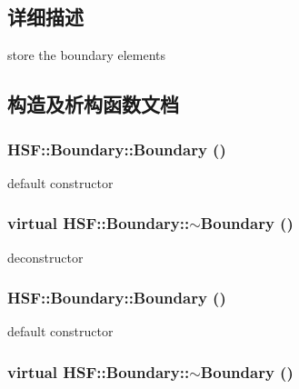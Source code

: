 \subsection{详细描述}
store the boundary elements 

\subsection{构造及析构函数文档}
\hypertarget{classHSF_1_1Boundary_a66741eb92598adf5e34a07568a0a8778}{
\subsubsection[{Boundary}]{\setlength{\rightskip}{0pt plus 5cm}HSF::Boundary::Boundary ()}}
\label{classHSF_1_1Boundary_a66741eb92598adf5e34a07568a0a8778}


default constructor \hypertarget{classHSF_1_1Boundary_a8249905be447e99edf81401f17093f5e}{
\subsubsection[{$\sim$Boundary}]{\setlength{\rightskip}{0pt plus 5cm}virtual HSF::Boundary::$\sim$Boundary ()}}
\label{classHSF_1_1Boundary_a8249905be447e99edf81401f17093f5e}


deconstructor \hypertarget{classHSF_1_1Boundary_a66741eb92598adf5e34a07568a0a8778}{
\subsubsection[{Boundary}]{\setlength{\rightskip}{0pt plus 5cm}HSF::Boundary::Boundary ()}}
\label{classHSF_1_1Boundary_a66741eb92598adf5e34a07568a0a8778}


default constructor \hypertarget{classHSF_1_1Boundary_a8249905be447e99edf81401f17093f5e}{
\subsubsection[{$\sim$Boundary}]{\setlength{\rightskip}{0pt plus 5cm}virtual HSF::Boundary::$\sim$Boundary ()}}
\label{classHSF_1_1Boundary_a8249905be447e99edf81401f17093f5e}


